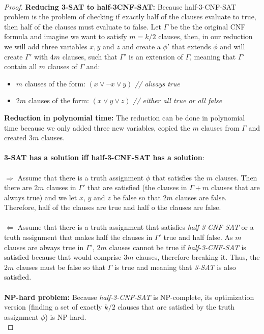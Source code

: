 \documentclass{article}
\begin{document}
\\
\begin{proof}
\textbf{Reducing 3-SAT to half-3CNF-SAT:} Because half-3-CNF-SAT problem is the problem of checking if exactly half of the clauses evaluate to true, then half of the clauses must evaluate to false. Let $\Gamma$ be the the original CNF formula and imagine we want to satisfy $m = k/2$ clauses, then, in our reduction we will add three variables $x, y$ and $z$ and create a $\phi'$ that extends $\phi$ and will create $\Gamma'$ with $4m$ clauses, such that $\Gamma'$ is an extension of $\Gamma$, meaning that $\Gamma'$ contain all $m$ clauses of $\Gamma$ and:
\begin{itemize}
\item $m$ clauses of the form: $(x \lor \lnot x \lor y)$ \textit{ // always true }
\item $2m$ clauses of the form: $(x \lor y \lor z)$ \textit{ // either all true or all false}
\end{itemize}
\textbf{Reduction in polynomial time:} The reduction can be done in polynomial time because we only added three new variables, copied the $m$ clauses from $\Gamma$ and created $3m$ clauses.
\\
\\
\textbf{3-SAT has a solution iff half-3-CNF-SAT has a solution}:
\\
\\
$\Longrightarrow $ Assume that there is a truth assignment $\phi$ that satisfies the $m$ clauses. Then there are $2m$ clauses in $\Gamma'$ that are satisfied (the clauses in $\Gamma + m$ clauses that are always true) and we let $x$, $y$ and $z$ be false so that $2m$ clauses are false. Therefore, half of the clauses are true and half o the clauses are false.
\\
\\
$\Longleftarrow $ Assume that there is a truth assignment that satisfies \textit{half-3-CNF-SAT} or a truth assignment that makes half the clauses in $\Gamma'$ true and half false. As $m$ clauses are always true in $\Gamma'$, $2m$ clauses cannot be true if \textit{half-3-CNF-SAT} is satisfied because that would comprise $3m$ clauses, therefore breaking it. Thus, the $2m$ clauses must be false so that $\Gamma$ is true and meaning that \textit{3-SAT} is also satisfied. 
\\
\\
\textbf{NP-hard problem:} Because \textit{half-3-CNF-SAT} is {NP-complete}, its optimization version (finding a set of exactly $k/2$ clauses that are satisfied by the truth assignment $\phi$) is NP-hard.
\\
\end{proof}
\end{document}
